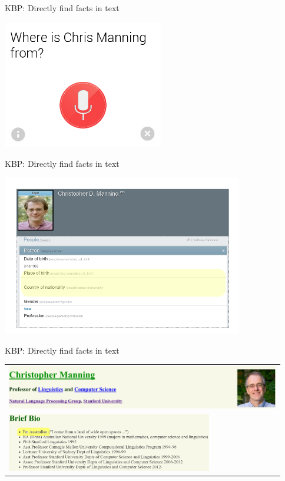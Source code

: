 \def\title{KBP: Directly find facts in text}
\begin{frame}{\title}
\begin{center}
  \includegraphics[width=7cm]{../img/google-chris-manning-origin.png}
\end{center}
\end{frame}

\begin{frame}[noframenumbering]{\title}
\vspace{-1cm}
\begin{center}
  \includegraphics[width=10.5cm]{../img/chris-freebase.png}
\end{center}
\end{frame}

\begin{frame}[noframenumbering]{\title}
\begin{center}
  \begin{tabular}{l}
  \includegraphics[width=12cm]{../img/chris-website-header.png} \\
  \includegraphics[width=9cm]{../img/chris-bio.png}
  \end{tabular}
\end{center}
\end{frame}

